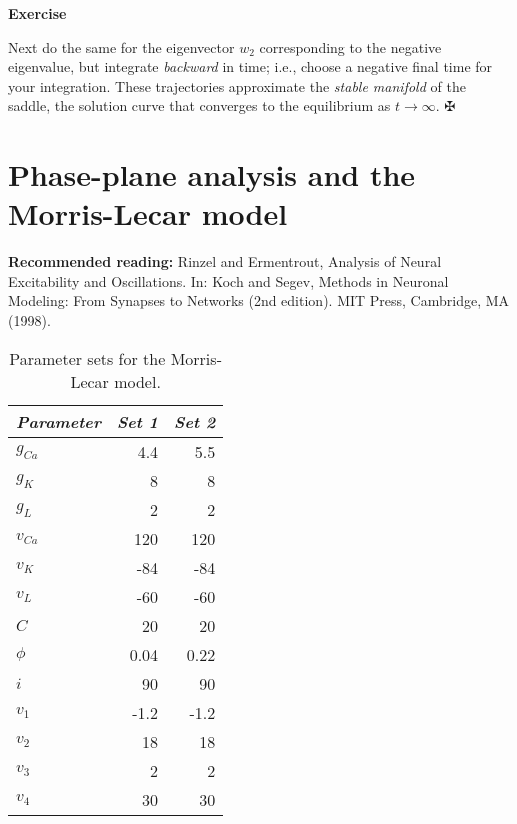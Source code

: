 \documentclass [11pt]{article}
\newcounter{exercise}
\numberwithin{exercise}{section}
\newcommand{\exnumber}{\addtocounter{exercise}{1} \theexercise \thinspace}
\begin{document}
{\bf Exercise \exnumber} Next do the same for the eigenvector $w_2$ corresponding to the
negative eigenvalue, but integrate \textit{backward} in time; i.e.,
choose a negative final time for your integration. These trajectories
approximate the {\it stable manifold} of the saddle, the solution curve that converges to the
equilibrium as $t \to \infty$. $\maltese$

\section{Phase-plane analysis and the Morris-Lecar model} \label{MLplane}

\textbf{Recommended reading:} Rinzel and Ermentrout, 
Analysis of Neural Excitability and Oscillations. In: Koch and Segev, Methods in Neuronal 
Modeling: From Synapses to Networks (2nd edition). MIT Press, Cambridge, MA (1998). 

\begin{table}[tbp]
\begin{center}
\begin{tabular}{||l|r|r||}
\hline
{\it Parameter} & {\it Set 1} & {\it Set 2} \\
\hline \hline
$g_{Ca}$ & 4.4 & 5.5\\ \hline
$g_K$ & 8 & 8 \\ \hline
$g_L$ & 2 & 2 \\ \hline
$v_{Ca}$ & 120 & 120 \\ \hline
$v_K$ & -84 & -84 \\ \hline
$v_L$ & -60 & -60 \\ \hline
$C$ & 20 & 20 \\ \hline
$\phi$ & 0.04 & 0.22 \\ \hline
$i$ & 90 & 90 \\ \hline
$v_1$ & -1.2 & -1.2 \\ \hline
$v_2$ & 18 &  18 \\ \hline
$v_3$ & 2 & 2 \\ \hline
$v_4$ & 30 & 30 \\ \hline
\end{tabular}
\end{center}
\caption{\small{Parameter sets for the Morris-Lecar model.}}
\label{ml_table}
\end{table}
\end{document}

